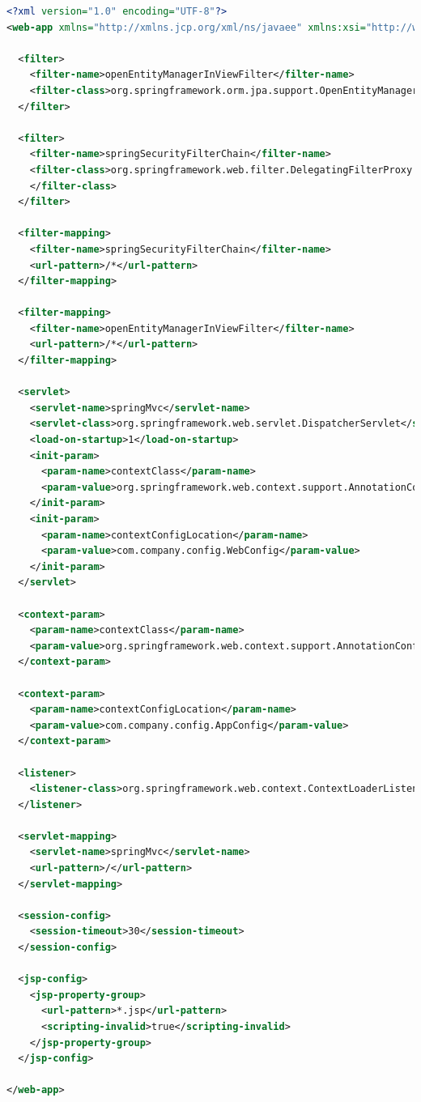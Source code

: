 \begin{lstlisting}[language=xml, title=WEB-INF/web.xml]
<?xml version="1.0" encoding="UTF-8"?>
<web-app xmlns="http://xmlns.jcp.org/xml/ns/javaee" xmlns:xsi="http://www.w3.org/2001/XMLSchema-instance" xsi:schemaLocation="http://xmlns.jcp.org/xml/ns/javaee http://xmlns.jcp.org/xml/ns/javaee/web-app_3_1.xsd" version="3.1">

  <filter>
    <filter-name>openEntityManagerInViewFilter</filter-name>
    <filter-class>org.springframework.orm.jpa.support.OpenEntityManagerInViewFilter</filter-class>
  </filter>

  <filter>
    <filter-name>springSecurityFilterChain</filter-name>
    <filter-class>org.springframework.web.filter.DelegatingFilterProxy
    </filter-class>
  </filter>

  <filter-mapping>
    <filter-name>springSecurityFilterChain</filter-name>
    <url-pattern>/*</url-pattern>
  </filter-mapping>

  <filter-mapping>
    <filter-name>openEntityManagerInViewFilter</filter-name>
    <url-pattern>/*</url-pattern>
  </filter-mapping>

  <servlet>
    <servlet-name>springMvc</servlet-name>
    <servlet-class>org.springframework.web.servlet.DispatcherServlet</servlet-class>
    <load-on-startup>1</load-on-startup>
    <init-param>
      <param-name>contextClass</param-name>
      <param-value>org.springframework.web.context.support.AnnotationConfigWebApplicationContext</param-value>
    </init-param>
    <init-param>
      <param-name>contextConfigLocation</param-name>
      <param-value>com.company.config.WebConfig</param-value>
    </init-param>
  </servlet>

  <context-param>
    <param-name>contextClass</param-name>
    <param-value>org.springframework.web.context.support.AnnotationConfigWebApplicationContext</param-value>
  </context-param>

  <context-param>
    <param-name>contextConfigLocation</param-name>
    <param-value>com.company.config.AppConfig</param-value>
  </context-param>

  <listener>
    <listener-class>org.springframework.web.context.ContextLoaderListener</listener-class>
  </listener>

  <servlet-mapping>
    <servlet-name>springMvc</servlet-name>
    <url-pattern>/</url-pattern>
  </servlet-mapping>

  <session-config>
    <session-timeout>30</session-timeout>
  </session-config>

  <jsp-config>
    <jsp-property-group>
      <url-pattern>*.jsp</url-pattern>
      <scripting-invalid>true</scripting-invalid>
    </jsp-property-group>
  </jsp-config>

</web-app>
\end{lstlisting}

